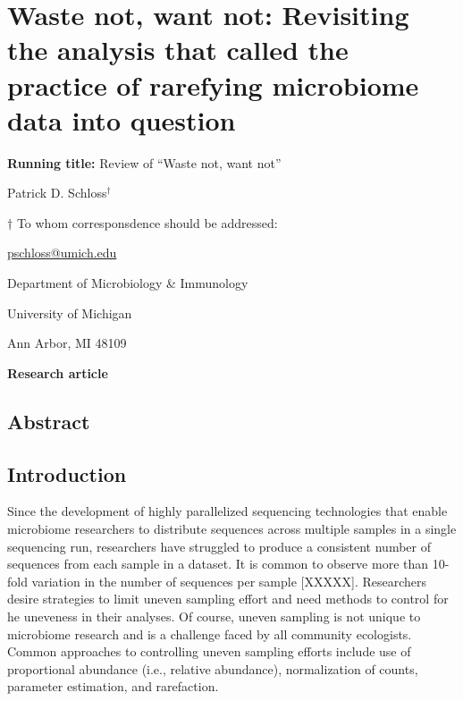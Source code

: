 \documentclass[
]{article}
\author{}
\date{\vspace{-2.5em}}
\begin{document}
\hypertarget{waste-not-want-not-revisiting-the-analysis-that-called-the-practice-of-rarefying-microbiome-data-into-question}{%
\section{Waste not, want not: Revisiting the analysis that called the
practice of rarefying microbiome data into
question}\label{waste-not-want-not-revisiting-the-analysis-that-called-the-practice-of-rarefying-microbiome-data-into-question}}

\vspace{20mm}

\textbf{Running title:} Review of ``Waste not, want not''

\vspace{20mm}

Patrick D. Schloss\({^\dagger}\)

\vspace{40mm}

\({\dagger}\) To whom corresponsdence should be addressed:

\href{mailto:pschloss@umich.edu}{pschloss@umich.edu}

Department of Microbiology \& Immunology

University of Michigan

Ann Arbor, MI 48109

\vspace{20mm}

\textbf{Research article}

\newpage

\hypertarget{abstract}{%
\subsection{Abstract}\label{abstract}}

\newpage

\hypertarget{introduction}{%
\subsection{Introduction}\label{introduction}}

Since the development of highly parallelized sequencing technologies
that enable microbiome researchers to distribute sequences across
multiple samples in a single sequencing run, researchers have struggled
to produce a consistent number of sequences from each sample in a
dataset. It is common to observe more than 10-fold variation in the
number of sequences per sample {[}XXXXX{]}. Researchers desire
strategies to limit uneven sampling effort and need methods to control
for he uneveness in their analyses. Of course, uneven sampling is not
unique to microbiome research and is a challenge faced by all community
ecologists. Common approaches to controlling uneven sampling efforts
include use of proportional abundance (i.e., relative abundance),
normalization of counts, parameter estimation, and rarefaction.
\end{document}
